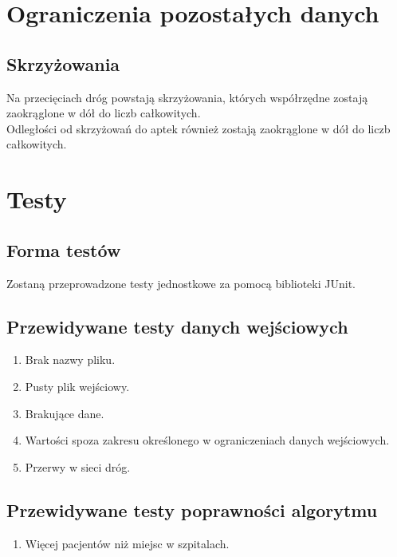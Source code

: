 \documentclass[a4paper,12pt,twoside]{article}
\begin{document}
\section{Ograniczenia pozostałych danych}
\subsection{Skrzyżowania}
Na przecięciach dróg powstają skrzyżowania, których współrzędne zostają zaokrąglone w dół do liczb całkowitych.\\Odległości od skrzyżowań do aptek również zostają zaokrąglone w dół do liczb całkowitych.
\section{Testy}
\subsection{Forma testów}
Zostaną przeprowadzone testy jednostkowe za pomocą biblioteki JUnit.
\subsection{Przewidywane testy danych wejściowych}
\begin{enumerate}
	\item Brak nazwy pliku.
	\item Pusty plik wejściowy.
	\item Brakujące dane.
	\item Wartości spoza zakresu określonego w ograniczeniach danych wejściowych.
	\item Przerwy w sieci dróg.
\end{enumerate}
\subsection{Przewidywane testy poprawności algorytmu}
\begin{enumerate}
\item Więcej pacjentów niż miejsc w szpitalach.
\end{enumerate}
\end{document}
